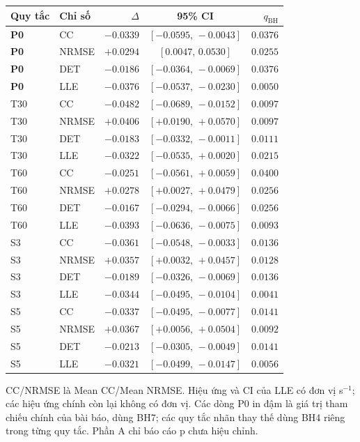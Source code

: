 \documentclass[conference,a4paper]{IEEEtran}
\begin{document}
\begin{table}[!t]
\begin{minipage}[t]{0.49\textwidth}
\begin{tabular*}{\linewidth}{@{\extracolsep{\fill}}llrcr@{}}
\toprule
Quy tắc & Chỉ số & $\Delta$ & 95\% CI & $q_{\mathrm{BH}}$\\
\midrule
\textbf{P0} & CC & $-0.0339$ & $[-0.0595,\,-0.0043]$ & $0.0376$\\
\textbf{P0} & NRMSE & $+0.0294$ & $[0.0047,\,0.0530]$ & $0.0255$\\
\textbf{P0} & DET & $-0.0186$ & $[-0.0364,\,-0.0069]$ & $0.0376$\\
\textbf{P0} & LLE & $-0.0376$ & $[-0.0537,\,-0.0230]$ & $0.0050$\\
T30 & CC & $-0.0482$ & $[-0.0689,\,-0.0152]$ & $0.0097$\\
T30 & NRMSE & $+0.0406$ & $[+0.0190,\,+0.0570]$ & $0.0097$\\
T30 & DET & $-0.0183$ & $[-0.0332,\,-0.0011]$ & $0.0111$\\
T30 & LLE & $-0.0322$ & $[-0.0535,\,+0.0020]$ & $0.0215$\\
T60 & CC & $-0.0251$ & $[-0.0561,\,+0.0059]$ & $0.0400$\\
T60 & NRMSE & $+0.0278$ & $[+0.0027,\,+0.0479]$ & $0.0256$\\
T60 & DET & $-0.0167$ & $[-0.0294,\,-0.0066]$ & $0.0256$\\
T60 & LLE & $-0.0393$ & $[-0.0636,\,-0.0075]$ & $0.0093$\\
S3 & CC & $-0.0361$ & $[-0.0548,\,-0.0033]$ & $0.0136$\\
S3 & NRMSE & $+0.0357$ & $[+0.0032,\,+0.0457]$ & $0.0128$\\
S3 & DET & $-0.0189$ & $[-0.0326,\,-0.0069]$ & $0.0136$\\
S3 & LLE & $-0.0344$ & $[-0.0495,\,-0.0104]$ & $0.0041$\\
S5 & CC & $-0.0337$ & $[-0.0495,\,-0.0077]$ & $0.0141$\\
S5 & NRMSE & $+0.0367$ & $[+0.0056,\,+0.0504]$ & $0.0092$\\
S5 & DET & $-0.0213$ & $[-0.0305,\,-0.0049]$ & $0.0141$\\
S5 & LLE & $-0.0321$ & $[-0.0499,\,-0.0147]$ & $0.0056$\\
\bottomrule
\end{tabular*}
\end{minipage}
\par\smallskip
\raggedright CC/NRMSE là Mean CC/Mean NRMSE. Hiệu ứng và CI của LLE có đơn vị s$^{-1}$; các hiệu ứng chính còn lại không có đơn vị. Các dòng P0 in đậm là giá trị tham chiếu chính của bài báo, dùng BH7; các quy tắc nhãn thay thế dùng BH4 riêng trong từng quy tắc. Phần A chỉ báo cáo p chưa hiệu chỉnh.

\end{table}
\end{document}
